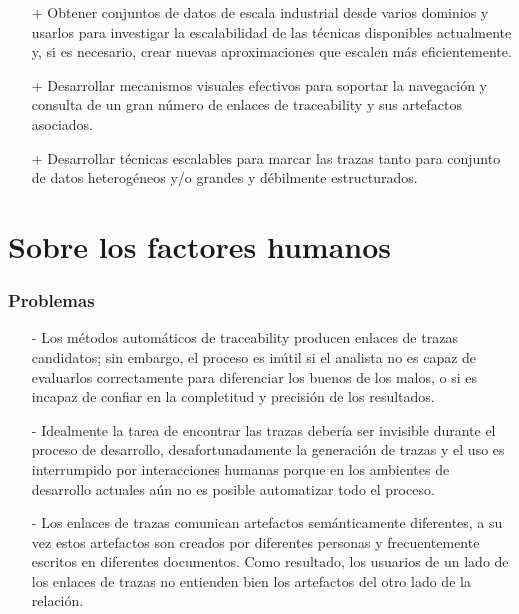 \documentclass[a4paper,12pt,oneside]{book}
\begin{document}
\begin{itemize}

\item[+]    Obtener conjuntos de datos de escala industrial desde varios dominios y usarlos para investigar la escalabilidad de las técnicas disponibles actualmente y, si es necesario, crear nuevas aproximaciones que escalen más eficientemente.

\item[+]    Desarrollar mecanismos visuales efectivos para soportar la navegación y consulta de un gran número de enlaces de traceability y sus artefactos asociados.

\item[+]    Desarrollar técnicas escalables para marcar las trazas tanto para conjunto de datos heterogéneos y/o grandes y débilmente estructurados.

\end{itemize}


\section{Sobre los factores humanos}

\subsubsection{Problemas}

\begin{itemize}

\item[-]     Los métodos automáticos de traceability producen enlaces de trazas candidatos; sin embargo, el proceso es inútil si el analista no es capaz de evaluarlos correctamente  para diferenciar los buenos de los malos, o si es incapaz de confiar en la completitud y precisión de los resultados.

\item[-]     Idealmente la tarea de encontrar las trazas debería ser invisible durante el proceso de desarrollo, desafortunadamente la generación de trazas y el uso es interrumpido por interacciones humanas porque en los ambientes de desarrollo actuales aún no es posible automatizar todo el proceso.

\item[-]     Los enlaces de trazas comunican artefactos semánticamente diferentes, a su vez estos artefactos son creados por diferentes personas y frecuentemente escritos en diferentes documentos. Como resultado, los usuarios de un lado de los enlaces de trazas no entienden bien los artefactos del otro lado de la relación.

\end{itemize}
\end{document}
